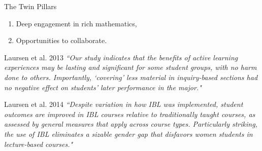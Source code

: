 \documentclass[10pt,handout]{beamer}
\begin{document}
\begin{frame}

\begin{block}{The Twin Pillars}
\begin{enumerate}
\item Deep engagement in rich mathematics,
\item Opportunities to collaborate.
\end{enumerate}
\end{block}

\begin{block}{Laursen et al. 2013}
\emph{``Our study indicates that the benefits of active learning experiences may be lasting and significant for some student groups, with no harm done to others. Importantly, ‘covering’ less material in inquiry-based sections had no negative effect on students' later performance in the major."}
\end{block}

\begin{block}{Laursen et al. 2014}
\emph{``Despite variation in how IBL was implemented, student outcomes are improved in IBL courses relative to traditionally taught courses, as assessed by general measures that apply across course types. Particularly striking, the use of IBL eliminates a sizable gender gap that disfavors women students in lecture-based courses."}
\end{block}

\end{frame}


%
%
%
%
%
%
%
%
%
%


%
%

\end{document}
